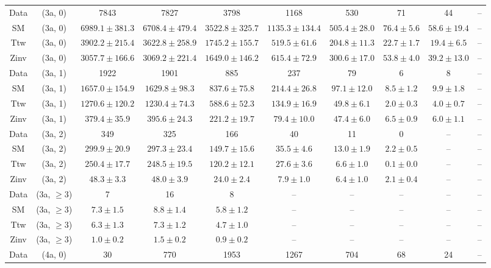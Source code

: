 \begin{table}[h!]
{\begin{tabular}{cccccccccc}
	Data & (3a, 0) & 7843 & 7827 & 3798 & 1168 & 530 & 71 & 44 & -- \\[0.5ex] 
	SM & (3a, 0) & $6989.1\pm 381.3$ & $6708.4\pm 479.4$ & $3522.8\pm 325.7$ & $1135.3\pm 134.4$ & $505.4\pm 28.0$ & $76.4\pm 5.6$ & $58.6\pm 19.4$ & -- \\[0.5ex] 
	Ttw & (3a, 0) & $3902.2\pm 215.4$ & $3622.8\pm 258.9$ & $1745.2\pm 155.7$ & $519.5\pm 61.6$ & $204.8\pm 11.3$ & $22.7\pm 1.7$ & $19.4\pm 6.5$ & -- \\[0.5ex] 
	Zinv & (3a, 0) & $3057.7\pm 166.6$ & $3069.2\pm 221.4$ & $1649.0\pm 146.2$ & $615.4\pm 72.9$ & $300.6\pm 17.0$ & $53.8\pm 4.0$ & $39.2\pm 13.0$ & -- \\[0.5ex] 
	Data & (3a, 1) & 1922 & 1901 & 885 & 237 & 79 & 6 & 8 & -- \\[0.5ex] 
	SM & (3a, 1) & $1657.0\pm 154.9$ & $1629.8\pm 98.3$ & $837.6\pm 75.8$ & $214.4\pm 26.8$ & $97.1\pm 12.0$ & $8.5\pm 1.2$ & $9.9\pm 1.8$ & -- \\[0.5ex] 
	Ttw & (3a, 1) & $1270.6\pm 120.2$ & $1230.4\pm 74.3$ & $588.6\pm 52.3$ & $134.9\pm 16.9$ & $49.8\pm 6.1$ & $2.0\pm 0.3$ & $4.0\pm 0.7$ & -- \\[0.5ex] 
	Zinv & (3a, 1) & $379.4\pm 35.9$ & $395.6\pm 24.3$ & $221.2\pm 19.7$ & $79.4\pm 10.0$ & $47.4\pm 6.0$ & $6.5\pm 0.9$ & $6.0\pm 1.1$ & -- \\[0.5ex] 
	Data & (3a, 2) & 349 & 325 & 166 & 40 & 11 & 0 & -- & -- \\[0.5ex] 
	SM & (3a, 2) & $299.9\pm 20.9$ & $297.3\pm 23.4$ & $149.7\pm 15.6$ & $35.5\pm 4.6$ & $13.0\pm 1.9$ & $2.2\pm 0.5$ & -- & -- \\[0.5ex] 
	Ttw & (3a, 2) & $250.4\pm 17.7$ & $248.5\pm 19.5$ & $120.2\pm 12.1$ & $27.6\pm 3.6$ & $6.6\pm 1.0$ & $0.1\pm 0.0$ & -- & -- \\[0.5ex] 
	Zinv & (3a, 2) & $48.3\pm 3.3$ & $48.0\pm 3.9$ & $24.0\pm 2.4$ & $7.9\pm 1.0$ & $6.4\pm 1.0$ & $2.1\pm 0.4$ & -- & -- \\[0.5ex] 
	Data & (3a, $\ge3$) & 7 & 16 & 8 & -- & -- & -- & -- & -- \\[0.5ex] 
	SM & (3a, $\ge3$) & $7.3\pm 1.5$ & $8.8\pm 1.4$ & $5.8\pm 1.2$ & -- & -- & -- & -- & -- \\[0.5ex] 
	Ttw & (3a, $\ge3$) & $6.3\pm 1.3$ & $7.3\pm 1.2$ & $4.7\pm 1.0$ & -- & -- & -- & -- & -- \\[0.5ex] 
	Zinv & (3a, $\ge3$) & $1.0\pm 0.2$ & $1.5\pm 0.2$ & $0.9\pm 0.2$ & -- & -- & -- & -- & -- \\[0.5ex] 
	Data & (4a, 0) & 30 & 770 & 1953 & 1267 & 704 & 68 & 24 & -- \\[0.5ex] 

\end{tabular}}
\end{table}
